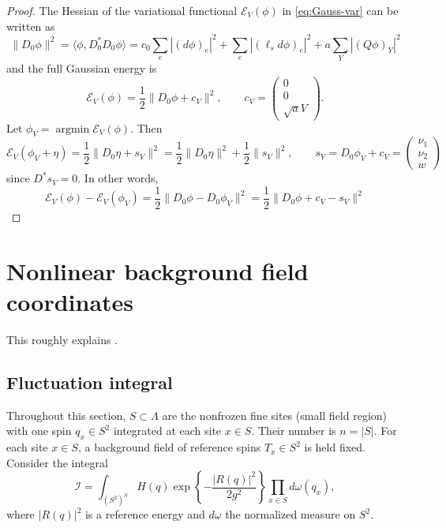 \documentclass[11pt]{article}
\numberwithin{equation}{section}
\theoremstyle{definition}
\theoremstyle{plain}
\begin{document}
\begin{proof}
The Hessian of the variational functional $\mathcal E_V(\phi)$ in \eqref{eq:Gauss-var} can be written as
\begin{equation}
 \|D_0\phi\|^2
 = \langle \phi, D_0^* D_0 \phi \rangle
 =c_0\sum_e|(d\phi)_e|^2
  +\sum_e|(\ell_s d\phi)_e|^2
  +a\sum_Y|(Q\phi)_Y|^2
\end{equation}
and the full Gaussian energy is
\begin{equation}
  \mathcal E_V(\phi) = \frac12 \|D_0\phi + c_V\|^2 ,
  \qquad
  c_V = \begin{pmatrix}
    0 \\ 0 \\ \sqrt{a} V 
  \end{pmatrix}.
\end{equation}
Let $\phi_V = \operatorname{argmin} \mathcal E_V(\phi)$. Then 
\begin{equation}
  \mathcal E_V(\phi_V + \eta) = \frac12 \|D_0\eta + s_V\|^2  = \frac12 \|D_0\eta\|^2 + \frac12 \|s_V\|^2,
  \qquad
  s_V
  = D_0\phi_V + c_V
  = \begin{pmatrix}
    \nu_1 \\ \nu_2 \\ w
  \end{pmatrix}
\end{equation}
since $D^*s_V=0$. In other words,
\begin{equation}
  \mathcal E_V(\phi)- \mathcal E_V(\phi_V)
  = \frac12 \|D_0\phi - D_0\phi_V\|^2
  = \frac12 \|D_0\phi +c_V - s_V\|^2
\end{equation}
\end{proof}



\newpage
\section{Nonlinear background field coordinates}
\label{sec:background-field}

This roughly explains \cite[Section~5.2]{OpenAI-O3}.

\subsection{Fluctuation integral}

Throughout this section, $S\subset \Lambda$ are the nonfrozen fine sites (small field region) with
 one spin $q_x \in S^2$ integrated at each site $x\in S$. 
Their number is $n=|S|$.
For each site $x\in S$, a background field of reference spins $T_x\in  S^2$ is held fixed.
Consider the integral
\begin{equation}
 \mathcal I=
 \int_{(S^2)^S} H(q)
    \exp\!\left\{-\frac{|R(q)|^2}{2g^2}\right\}
    \prod_{x\in S}d\omega(q_x),
 \label{eq:spin-integral}
\end{equation}
where $|R(q)|^2$ is a reference energy and $d\omega$ the normalized measure on $S^2$.
\end{document}
